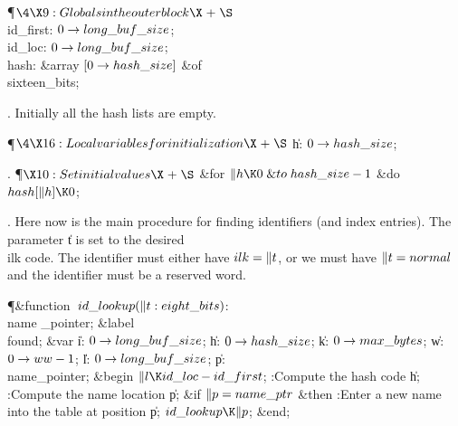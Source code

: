 \Y\P$\4\X9:Globals in the outer block\X\mathrel{+}\S$\6
\4\\{id\_first}: $0\to\\{long\_buf\_size}$;\6
\4\\{id\_loc}: $0\to\\{long\_buf\_size}$;\7
\4\\{hash}: \&{array} $[0\to\\{hash\_size}]$ \1\&{of}\5
\\{sixteen\_bits};\2\par
\fi

. Initially all the hash lists are empty.

\Y\P$\4\X16:Local variables for initialization\X\mathrel{+}\S$\6
\4\|h: $0\to\\{hash\_size}$;\par
\fi

. \P$\X10:Set initial values\X\mathrel{+}\S$\6
\&{for} $\|h\K0\mathrel{\&{to}}\\{hash\_size}-1$ \1\&{do}\5
$\\{hash}[\|h]\K0$;\2\par
\fi

. Here now is the main procedure for finding identifiers (and index
entries).  The parameter \|t is set to the desired \\{ilk} code. The
identifier must either have $\\{ilk}=\|t$, or we must have
$\|t=\\{normal}$ and the identifier must be a reserved word.

\Y\P\4\&{function}\1\  $\\{id\_lookup}(\|t:\\{eight\_bits})$: \\{name%
\_pointer};\6
\4\&{label} \\{found};\6
\4\&{var} \|i: $0\to\\{long\_buf\_size}$;\6
\|h: $0\to\\{hash\_size}$;\6
\|k: $0\to\\{max\_bytes}$;\6
\|w: $0\to\\{ww}-1$;\6
\|l: $0\to\\{long\_buf\_size}$;\6
\|p: \\{name\_pointer};\2\6
\&{begin} $\|l\K\\{id\_loc}-\\{id\_first}$;\6
:Compute the hash code \|h\X;\6
:Compute the name location \|p\X;\6
\&{if} $\|p=\\{name\_ptr}$ \1\&{then}\5
:Enter a new name into the table at position \|p\X;\2\6
$\\{id\_lookup}\K\|p$;\6
\&{end};\par
\fi

